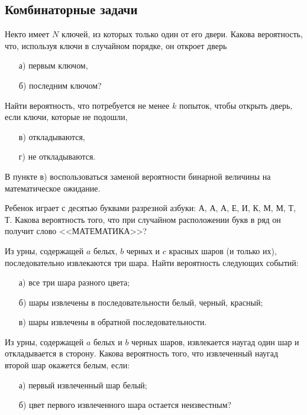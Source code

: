 \subsection{Комбинаторные задачи}

\begin{problem}
Некто имеет $N$ ключей, из которых только один от его двери. Какова вероятность, что, используя ключи в случайном порядке, 
он откроет дверь 
\begin{enumerate}
\item[а)] первым ключом, 
\item[б)] последним ключом? 
\end{enumerate}
Найти вероятность, что потребуется не менее $k$ попыток, чтобы открыть дверь, если ключи, которые не подошли, 
\begin{enumerate}
\item[в)] откладываются, 
\item[г)] не откладываются. 
\end{enumerate}

\begin{ordre}
В пункте в) воспользоваться заменой вероятности бинарной величины на математическое ожидание.
\end{ordre}

\end{problem}


\begin{problem}
Ребенок играет с десятью буквами разрезной азбуки: А, А, А, Е, И, К, М, М, Т, Т. 
Какова вероятность того, что при случайном расположении букв в ряд он получит слово <<МАТЕМАТИКА>>? 
\end{problem}


\begin{problem}
Из урны, содержащей $a$ белых, $b$ черных и $c$ красных шаров (и только их), последовательно извлекаются три шара. Найти 
вероятность следующих событий: 
\begin{enumerate}
\item[а)] все три шара разного цвета; 
\item[б)] шары извлечены в последовательности белый, черный, красный; 
\item[в)] шары извлечены в обратной последовательности. 
\end{enumerate}
\end{problem}



\begin{problem}
Из урны, содержащей $a$ белых и $b$ черных шаров, извлекается наугад один шар и откладывается в сторону. Какова вероятность 
того, что извлеченный наугад второй шар окажется белым, если: 
\begin{enumerate}
\item[а)] первый извлеченный шар белый; 
\item[б)] цвет  первого извлеченного шара остается неизвестным? 
\end{enumerate}
\end{problem}




